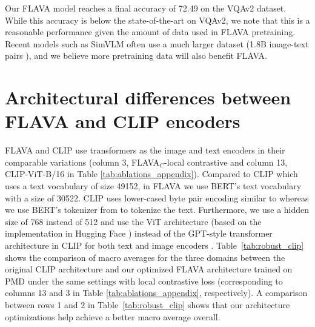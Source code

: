 \documentclass[10pt,twocolumn,letterpaper]{article}
\begin{document}
Our FLAVA model reaches a final accuracy of 72.49 on the VQAv2 dataset. While this accuracy is below the state-of-the-art on VQAv2, we note that this is a reasonable performance given the amount of data used in FLAVA pretraining. Recent models such as SimVLM \cite{wang2021simvlm} often use a much larger dataset (\eg 1.8B image-text pairs \cite{wang2021simvlm}), and we believe more pretraining data will also benefit FLAVA.

\section{Architectural differences between FLAVA and CLIP encoders}

\begin{table}[ht!]
\vspace{-0.5em}
\caption{Comparing our FLAVA image and text encoders to the original CLIP when trained under same settings on PMD.}
\label{tab:robust_clip}
\vspace{-0.5em}
\end{table}

FLAVA and CLIP \cite{radford2021learning} use transformers \cite{vaswani2017attention} as the image and text encoders in their comparable variations (column 3, FLAVA$_{C}$-local contrastive and column 13, CLIP-ViT-B/16 in Table \ref{tab:ablations_appendix}). Compared to CLIP which uses a text vocabulary of size 49152, in FLAVA we use BERT's text vocabulary with a size of 30522. CLIP uses lower-cased byte pair encoding similar to \cite{sennrich2015neural,radford2018improving} whereas we use BERT's tokenizer from \cite{wolf2020huggingfaces} to tokenize the text. Furthermore, we use a hidden size of 768 instead of 512 and use the ViT architecture (based on the implementation in Hugging Face \cite{wolf2020huggingfaces}) instead of the GPT-style transformer architecture in CLIP for both text and image encoders \cite{xiong2020layer}. Table~\ref{tab:robust_clip} shows the comparison of macro averages for the three domains between the original CLIP architecture and our optimized FLAVA architecture trained on PMD under the same settings with local contrastive loss (corresponding to columns 13 and 3 in Table \ref{tab:ablations_appendix}, respectively). A comparison between rows 1 and 2 in Table~\ref{tab:robust_clip} shows that our architecture optimizations help achieve a better macro average overall.
\end{document}
